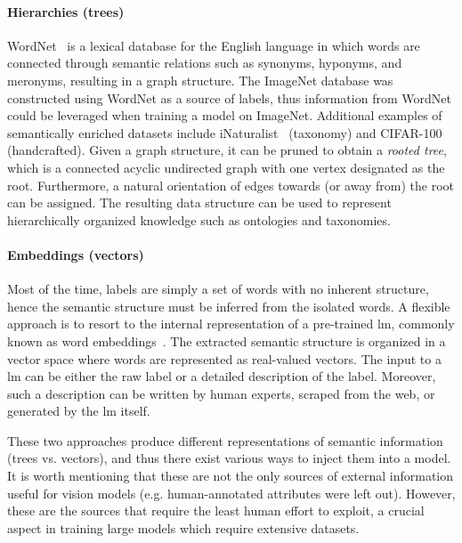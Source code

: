 \paragraph{Hierarchies (trees)} %
\label{par:hierarchies-tree}
WordNet~\cite{WordnetMi1995} is a lexical database for the English language in
which words are connected through semantic relations such as synonyms,
hyponyms, and meronyms, resulting in a graph structure. The ImageNet database
was constructed using WordNet as a source of labels, thus information from
WordNet could be leveraged when training a model on ImageNet. Additional
examples of semantically enriched datasets include
iNaturalist~\cite{TheInaturalistHorn2017} (taxonomy) and
CIFAR-100~\cite{LearningMultipKrizhe2009} (handcrafted). Given a graph
structure, it can be pruned to obtain a \emph{rooted tree}, which is a
connected acyclic undirected graph with one vertex designated as the root.
Furthermore, a natural orientation of edges towards (or away from) the root can
be assigned. The resulting data structure can be used to represent
hierarchically organized knowledge such as ontologies and taxonomies.

\paragraph{Embeddings (vectors)}
\label{par:embeddings-vectors}
Most of the time, labels are simply a set of words with no inherent structure,
hence the semantic structure must be inferred from the isolated words. A
flexible approach is to resort to the internal representation of a pre-trained
\acrfull{lm}, commonly known as word embeddings~\cite{BeyondWordEmbIncitt2023}.
The extracted semantic structure is organized in a vector space where words are
represented as real-valued vectors. The input to a \acrshort{lm} can be either
the raw label or a detailed description of the label. Moreover, such a
description can be written by human experts, scraped from the web, or generated
by the \acrshort{lm} itself.\medskip

These two approaches produce different representations of semantic information
(trees vs. vectors), and thus there exist various ways to inject them into a
model. It is worth mentioning that these are not the only sources of external
information useful for vision models (e.g. human-annotated attributes were left
out). However, these are the sources that require the least human effort to
exploit, a crucial aspect in training large models which require extensive
datasets.

